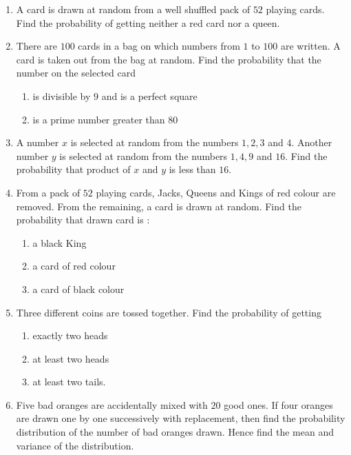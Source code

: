 \begin{enumerate}
    \item A card is drawn at random from a well shuffled pack of $52$ playing cards. Find the probability of getting neither a red card nor a queen.\\
    \item There are $100$ cards in a bag on which numbers from $1$ to $100$ are written. A card is taken out from the bag at random. Find the probability that the number on the selected card
          \begin{enumerate}[label=(\roman*)]
              \item is divisible by $9$ and is a perfect square
              \item is a prime number greater than $80$
          \end{enumerate}
    \item A number $x$ is selected at random from the numbers $1, 2, 3$ and $4$. Another number $y$ is selected at random from the numbers $1, 4, 9$ and $16$. Find the probability that product of $x$ and $y$ is less than $16$.\\
    \item From a pack of $52$ playing cards, Jacks, Queens and Kings of red colour are removed. From the remaining, a card is drawn at random. Find the probability that drawn card is :
          \begin{enumerate}[label=(\roman*)]
              \item a black King
              \item a card of red colour
              \item a card of black colour
          \end{enumerate}
    \item  Three different coins are tossed together. Find the probability of getting
          \begin{enumerate}[label=(\roman*)]
              \item exactly two heads
              \item at least two heads
              \item at least two tails.

          \end{enumerate}
    \item Five bad oranges are accidentally mixed with $20$ good ones. If four oranges are drawn one by one successively with replacement, then find the probability distribution of the number of bad oranges drawn. Hence find the mean and variance of the distribution.

\end{enumerate}
